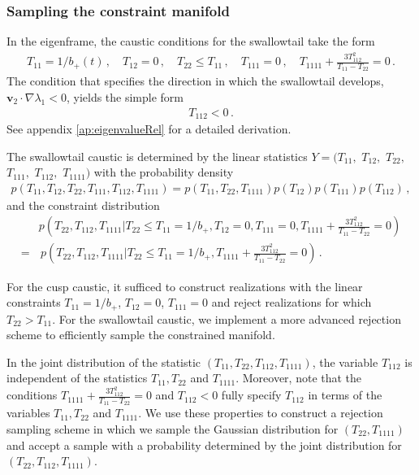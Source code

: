 \documentclass[a4paper, 11pt]{article}
\begin{document}
\subsubsection{Sampling the constraint manifold}
In the eigenframe, the caustic conditions for the swallowtail take the form
\begin{align}
T_{11}=1/b_+(t)\,, \quad T_{12}=0\,,\quad T_{22}\leq T_{11}\,,\quad T_{111}=0\,, \quad T_{1111}+\frac{3T_{112}^2}{T_{11}-T_{22}} =0\,.
\end{align}
The condition that specifies the direction in which the swallowtail develops, $\bm{v}_2 \cdot \nabla \lambda_1  <0$, yields the simple form 
\begin{align}
T_{112} <0\,.
\end{align}
See appendix \ref{ap:eigenvalueRel} for a detailed derivation. 

The swallowtail caustic is determined by the linear statistics $Y=(T_{11},$ $T_{12},$ $T_{22},$ $T_{111},$ $T_{112},$ $T_{1111})$ with the probability density
\begin{align}
p(T_{11},T_{12},T_{22},T_{111},T_{112},T_{1111})=p(T_{11},T_{22},T_{1111})p(T_{12})p(T_{111})p(T_{112})\,,
\end{align}
and the constraint distribution 
\begin{align}
&p\left(T_{22},T_{112},T_{1111}|T_{22}\leq T_{11}=1/b_+, T_{12}=0,T_{111}=0,T_{1111}+\frac{3T_{112}^2}{T_{11}-T_{22}}=0\right)\nonumber\\
=&\, p\left(T_{22},T_{112}, T_{1111}|T_{22}\leq T_{11}=1/b_+, T_{1111}+\frac{3T_{112}^2}{T_{11}-T_{22}}=0\right)\,.
\end{align}

For the cusp caustic, it sufficed to construct realizations with the linear constraints $T_{11}=1/b_+$, $T_{12}=0$, $T_{111}=0$ and reject realizations for which $T_{22} > T_{11}$. For the swallowtail caustic, we implement a more advanced rejection scheme to efficiently sample the constrained manifold.

In the joint distribution of the statistic $(T_{11},T_{22},T_{112},T_{1111})$, the variable $T_{112}$ is independent of the statistics $T_{11}, T_{22}$ and $T_{1111}$. Moreover, note that the conditions $T_{1111}+\frac{3T_{112}^2}{T_{11}-T_{22}}=0$ and $T_{112}<0$ fully specify $T_{112}$ in terms of the variables $T_{11},T_{22}$ and $T_{1111}$. We use these properties to construct a rejection sampling scheme in which we sample the Gaussian distribution for $(T_{22},T_{1111})$ and accept a sample with a probability determined by the joint distribution for $(T_{22},T_{112},T_{1111})$.
\end{document}

